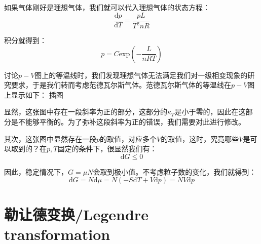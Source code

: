 \documentclass[a4paper, 10pt, openany]{book}%
\begin{document}
如果气体刚好是理想气体，我们就可以代入理想气体的状态方程：
\begin{equation}
  \frac{\mathrm{d}p}{\mathrm{d}T}=\frac{pL}{T^2 nR}
\end{equation}

积分就得到：
\begin{equation}
p=C\mathrm{exp}({-\frac{L}{nRT}})
\end{equation}

讨论$p-V$图上的等温线时，我们发现理想气体无法满足我们对一级相变现象的研究要求，于是我们转而考虑范德瓦尔斯气体。范德瓦尔斯气体的等温线在$p-V$图上显示如下：
插图

显然，这张图中存在一段斜率为正的部分，这部分的$\kappa_T$是小于零的，因此在这部分是不能够平衡的。为了弥补这段斜率为正的错误，我们需要对此进行修改。

其次，这张图中显然存在一段$p$的取值，对应多个$V$的取值，这时，究竟哪些$V$是可以取到的？在$p,T$固定的条件下，很显然我们有：
\begin{equation}
\mathrm{d}G\leq0
\end{equation}

因此，稳定情况下，$G=\mu N$会取到极小值。不考虑粒子数的变化，我们就得到：
\begin{equation}
\mathrm{d}G=N\mathrm{d}\mu=N(-S\mathrm{d}T+V\mathrm{d}p)=NV\mathrm{d}p
\end{equation}




\newpage
\appendix
\chapter{勒让德变换/Legendre transformation}
\end{document}

